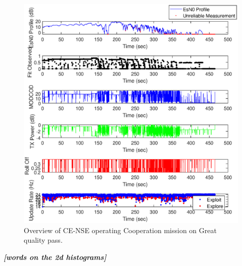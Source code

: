\begin{figure}[ht]
\centering
\includegraphics[width=\textwidth]{figures/flight_results/coop_great_nse_overview.eps}
\caption{Overview of CE-NSE operating Cooperation mission on Great quality pass.}
\label{fig:flight_nse_coop_great_overview}
\end{figure}


\par \textbf{\textit{[words on the 2d histograms]}}

